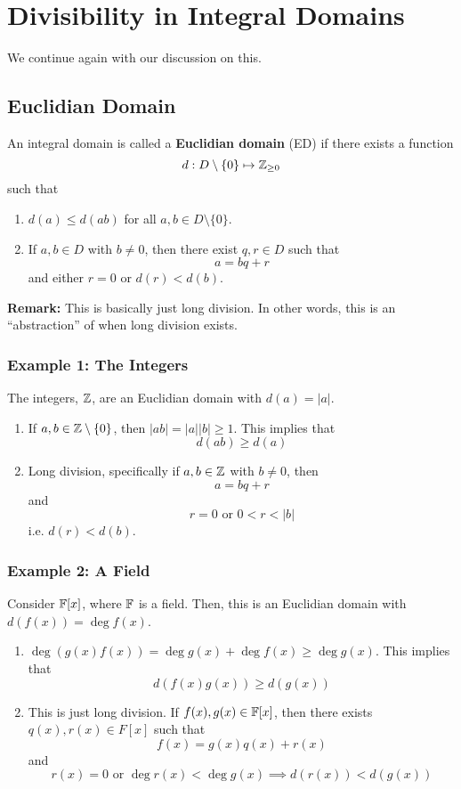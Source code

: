 \documentclass[letterpaper]{article}
\begin{document}
\section{Divisibility in Integral Domains}
We continue again with our discussion on this. 

\subsection{Euclidian Domain}
\begin{definition}{}{}
    An integral domain is called a \textbf{Euclidian domain} (ED) if there exists a function 
    \[d: D \setminus \{0\} \mapsto \mathbb{Z}_{\geq 0}\]
    such that
    \begin{enumerate}
        \item $d(a) \leq d(ab)$ for all $a, b \in D \setminus \{0\}$.
        \item If $a, b \in D$ with $b \neq 0$, then there exist $q, r \in D$ such that
        \[a = bq + r\]
        and either $r = 0$ or $d(r) < d(b)$. 
    \end{enumerate}
\end{definition}
\textbf{Remark:} This is basically just long division. In other words, this is an ``abstraction'' of when long division exists. 

\subsubsection{Example 1: The Integers}
The integers, $\mathbb{Z}$, are an Euclidian domain with $d(a) = |a|$. 
\begin{enumerate}
    \item If $a, b \in \mathbb{Z} \setminus \{0\}$, then $|ab| = |a||b| \geq 1$. This implies that 
    \[d(ab) \geq d(a)\]
    \item Long division, specifically if $a, b \in \mathbb{Z}$ with $b \neq 0$, then 
    \[a = bq + r\]
    and 
    \[r = 0 \text{ or } 0 < r < |b|\]
    i.e. $d(r) < d(b)$. 
\end{enumerate}

\subsubsection{Example 2: A Field}
Consider $\mathbb{F}[x]$, where $\mathbb{F}$ is a field. Then, this is an Euclidian domain with $d(f(x)) = \deg f(x)$. 
\begin{enumerate}
    \item $\deg(g(x)f(x)) = \deg g(x) + \deg f(x) \geq \deg g(x)$. This implies that 
    \[d(f(x) g(x)) \geq d(g(x))\]

    \item This is just long division. If $f(x), g(x) \in \mathbb{F}[x]$, then there exists $q(x), r(x) \in F[x]$ such that 
    \[f(x) = g(x)q(x) + r(x)\]
    and 
    \[r(x) = 0 \text{ or } \deg r(x) < \deg g(x) \implies d(r(x)) < d(g(x))\]
\end{enumerate}
\end{document}
